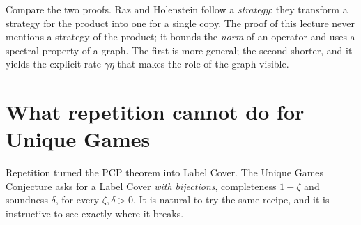 \noindent
Compare the two proofs.  Raz and Holenstein follow a \emph{strategy}: they transform a strategy for the product into one for a single copy.  The proof of this lecture never mentions a strategy of the product; it bounds the \emph{norm} of an operator and uses a spectral property of a graph.
The first is more general; the second shorter, and it yields the explicit rate $\gamma\eta$ that makes the role of the graph visible.


\section{What repetition cannot do for Unique Games}
\label{sec:ugc-rep}

Repetition turned the PCP theorem into Label Cover.  The Unique Games Conjecture asks for a Label Cover \emph{with bijections}, completeness $1-\zeta$ and soundness $\delta$, for every $\zeta,\delta>0$.  It is natural to try the same recipe, and it is instructive to see exactly where it breaks.

